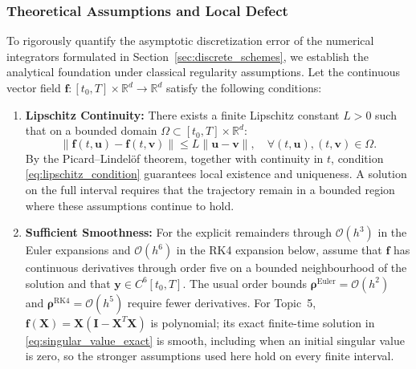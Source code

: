 \subsubsection{Theoretical Assumptions and Local Defect}
To rigorously quantify the asymptotic discretization error of the numerical integrators formulated in Section~\ref{sec:discrete_schemes}, we establish the analytical foundation under classical regularity assumptions. Let the continuous vector field $\mathbf{f}: [t_0, T] \times \mathbb{R}^d \to \mathbb{R}^d$ satisfy the following conditions:
\begin{enumerate}
    \item \textbf{Lipschitz Continuity:} There exists a finite Lipschitz constant $L > 0$ such that on a bounded domain $\Omega \subset [t_0, T] \times \mathbb{R}^d$:
    \begin{equation}
    \label{eq:lipschitz_condition}
    \|\mathbf{f}(t, \mathbf{u}) - \mathbf{f}(t, \mathbf{v})\| \le L \|\mathbf{u} - \mathbf{v}\|, \quad \forall (t, \mathbf{u}), (t, \mathbf{v}) \in \Omega.
    \end{equation}
    By the Picard--Lindel\"of theorem, together with continuity in $t$, condition \eqref{eq:lipschitz_condition} guarantees local existence and uniqueness. A solution on the full interval requires that the trajectory remain in a bounded region where these assumptions continue to hold.
    \item \textbf{Sufficient Smoothness:} For the explicit remainders through $\mathcal{O}(h^3)$ in the Euler expansions and $\mathcal{O}(h^6)$ in the RK4 expansion below, assume that $\mathbf f$ has continuous derivatives through order five on a bounded neighbourhood of the solution and that $\mathbf y\in C^6[t_0,T]$. The usual order bounds $\boldsymbol\rho^{\mathrm{Euler}}=\mathcal{O}(h^2)$ and $\boldsymbol\rho^{\mathrm{RK4}}=\mathcal{O}(h^5)$ require fewer derivatives. For Topic~5, $\mathbf f(\mathbf X)=\mathbf X(\mathbf I-\mathbf X^T\mathbf X)$ is polynomial; its exact finite-time solution in \eqref{eq:singular_value_exact} is smooth, including when an initial singular value is zero, so the stronger assumptions used here hold on every finite interval.
\end{enumerate}

